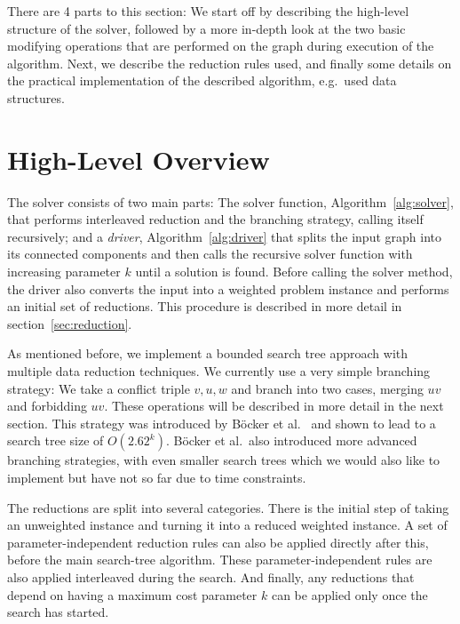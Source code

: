 \documentclass[12pt,oneside,english,parskip=full,headings=small]{scrbook}
\theoremstyle{definition}
\begin{document}
There are 4 parts to this section: We start off by describing the high-level structure of the
solver, followed by a more in-depth look at the two basic modifying operations that are performed on
the graph during execution of the algorithm. Next, we describe the reduction rules used, and finally
some details on the practical implementation of the described algorithm, e.g.\ used data structures.

\section{High-Level Overview}

The solver consists of two main parts: The solver function, Algorithm~\ref{alg:solver}, that
performs interleaved reduction and the branching strategy, calling itself recursively; and a
\emph{driver}, Algorithm~\ref{alg:driver} that splits the input graph into its connected components
and then calls the recursive solver function with increasing parameter $k$ until a solution is
found. Before calling the solver method, the driver also converts the input into a weighted problem
instance and performs an initial set of reductions. This procedure is described in more detail in
section~\ref{sec:reduction}.

As mentioned before, we implement a bounded search tree approach with multiple data reduction
techniques. We currently use a very simple branching strategy: We take a conflict triple $v, u, w$
and branch into two cases, merging $uv$ and forbidding $uv$. These operations will be described in
more detail in the next section. This strategy was introduced by Böcker et al.~\cite{GoingWeighted}
and shown to lead to a search tree size of $O(2.62^k)$. Böcker et al.\ also introduced more advanced
branching strategies, with even smaller search trees which we would also like to implement but have
not so far due to time constraints.

The reductions are split into several categories. There is the initial step of taking an
unweighted instance and turning it into a reduced weighted instance. A set of parameter-independent
reduction rules can also be applied directly after this, before the main search-tree algorithm.
These parameter-independent rules are also applied interleaved during the search. And finally, any
reductions that depend on having a maximum cost parameter $k$ can be applied only once the search
has started.
\end{document}
